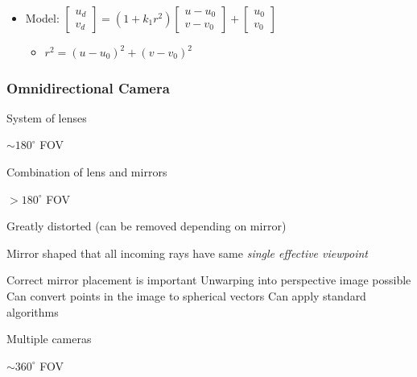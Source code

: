 \begin{itemize}
\begin{itemize}
            \item Model:
                $\begin{bmatrix}
                    u_d\\
                    v_d
                \end{bmatrix} = (1 + k_1 r^2)
                \begin{bmatrix}
                    u - u_0\\
                    v - v_0
                \end{bmatrix} +
                \begin{bmatrix}
                    u_0\\
                    v_0
                \end{bmatrix}$
                \begin{itemize}
                     Intrinsic parameter
                    \item $r^2 = (u - u_0)^2 + (v - v_0)^2$
                \end{itemize}
        \end{itemize}
\end{itemize}

\subsubsection{Omnidirectional Camera}
\begin{itemize}
        \begin{itemize*}
            \item System of lenses
            \item $\sim 180^\circ$ FOV
        \end{itemize*}
        \begin{itemize*}
            \item Combination of lens and mirrors
            \item $> 180^\circ$ FOV
            \item Greatly distorted (can be removed depending on mirror)
        \end{itemize*}
        \begin{itemize}
             Mirror shaped that all incoming rays have same \textit{single effective viewpoint}
                \begin{itemize}
                    \ides Correct mirror placement is important
                    \ipro Unwarping into perspective image possible
                    \ipro Can convert points in the image to spherical vectors
                    \ipro Can apply standard algorithms
                \end{itemize}
        \end{itemize}
        \begin{itemize*}
            \item Multiple cameras
            \item $\sim 360^\circ$ FOV
        \end{itemize*}
\end{itemize}


